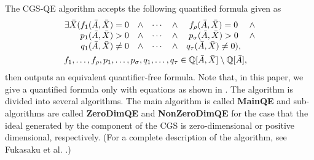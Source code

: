 \documentclass{birkjour}
\theoremstyle{plain}
\theoremstyle{definition}
\newcommand{\Q}[0]{\mathbb{Q}}
\newcommand{\Abar}{\bar{A}}
\newcommand{\Xbar}{\bar{X}}
\begin{document}
    The CGS-QE algorithm accepts the following quantified formula given as 
    \begin{gather*}
        \begin{array}[]{rccccc}
            \exists \Xbar 
            (f_1(\Abar,\Xbar)=0 & \land & \cdots & \land & f_\rho(\Abar,\Xbar)=0 & \land \\
             p_1(\Abar,\Xbar)>0 & \land & \cdots & \land & p_\sigma(\Abar,\Xbar)>0 & \land \\
             q_1(\Abar,\Xbar)\ne 0 & \land & \cdots & \land & q_\tau(\Abar,\Xbar)\ne 0),
        \end{array}
        \\
        \begin{split}
            f_1,\dots,f_\rho,p_1,\dots,p_\sigma,q_1,\dots,q_\tau &\in\Q[\Abar,\Xbar]\setminus\Q[\Abar],
        \end{split}
        \nonumber
    \end{gather*}
    then outputs an equivalent quantifier-free formula.
    Note that, in this paper, we give a quantified formula only with equations as shown 
    in .
    The algorithm is divided into several algorithms. 
    The main algorithm is called \textbf{MainQE} and sub-algorithms are called
    \textbf{ZeroDimQE} and \textbf{NonZeroDimQE} for the case that
    the ideal generated by the component of the CGS is zero-dimensional or 
    positive dimensional, respectively.
    (For a complete description of the algorithm, see Fukasaku et al. \cite{fuk-iwa-sat2015}.)
\end{document}

